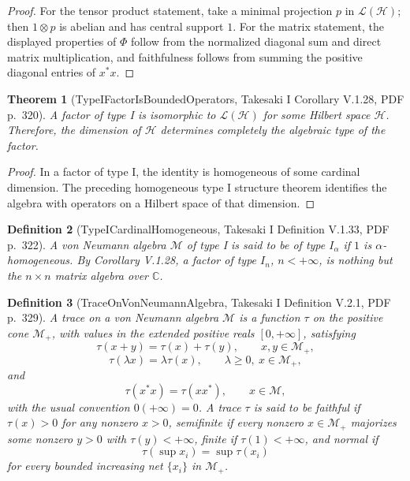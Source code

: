 \documentclass{article}
\newtheorem{definition}{Definition}
\newtheorem{theorem}[definition]{Theorem}
\begin{document}
\begin{proof}
For the tensor product statement, take a minimal projection \(p\) in
\(\mathcal L(\mathcal H)\); then \(1\otimes p\) is abelian and has central
support \(1\).  For the matrix statement, the displayed properties of
\(\Phi\) follow from the normalized diagonal sum and direct matrix
multiplication, and faithfulness follows from summing the positive diagonal
entries of \(x^*x\).
\end{proof}

\begin{theorem}[TypeIFactorIsBoundedOperators, Takesaki I Corollary V.1.28, PDF p.~320]
A factor of type I is isomorphic to \(\mathcal L(\mathcal H)\) for some
Hilbert space \(\mathcal H\).  Therefore, the dimension of
\(\mathcal H\) determines completely the algebraic type of the factor.
\end{theorem}

\begin{proof}
In a factor of type I, the identity is homogeneous of some cardinal dimension.
The preceding homogeneous type I structure theorem identifies the algebra with
operators on a Hilbert space of that dimension.
\end{proof}

\begin{definition}[TypeICardinalHomogeneous, Takesaki I Definition V.1.33, PDF p.~322]
A von Neumann algebra \(\mathcal M\) of type I is said to be of type
\(I_\alpha\) if \(1\) is \(\alpha\)-homogeneous.  By Corollary V.1.28, a
factor of type \(I_n\), \(n<+\infty\), is nothing but the \(n\times n\) matrix
algebra over \(\mathbb C\).
\end{definition}

\begin{definition}[TraceOnVonNeumannAlgebra, Takesaki I Definition V.2.1, PDF p.~329]
A trace on a von Neumann algebra \(\mathcal M\) is a function \(\tau\) on the
positive cone \(\mathcal M_+\), with values in the extended positive reals
\([0,+\infty]\), satisfying
\[
  \tau(x+y)=\tau(x)+\tau(y),\qquad x,y\in\mathcal M_+,
\]
\[
  \tau(\lambda x)=\lambda\tau(x),\qquad \lambda\geq0,\ x\in\mathcal M_+,
\]
and
\[
  \tau(x^*x)=\tau(xx^*),\qquad x\in\mathcal M,
\]
with the usual convention \(0(+\infty)=0\).  A trace \(\tau\) is said to be
faithful if \(\tau(x)>0\) for any nonzero \(x>0\), semifinite if every nonzero
\(x\in\mathcal M_+\) majorizes some nonzero \(y>0\) with
\(\tau(y)<+\infty\), finite if \(\tau(1)<+\infty\), and normal if
\[
  \tau(\sup x_i)=\sup\tau(x_i)
\]
for every bounded increasing net \(\{x_i\}\) in \(\mathcal M_+\).
\end{definition}
\end{document}
